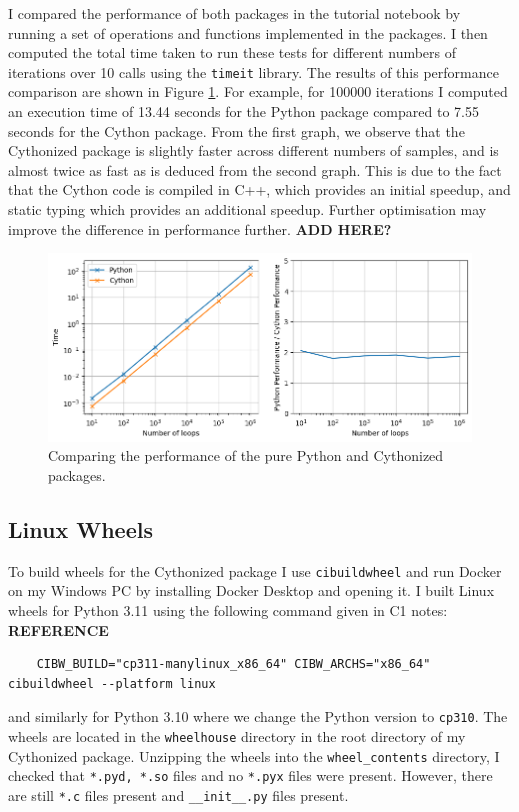 \documentclass{article}
\begin{document}
I compared the performance of both packages in the tutorial notebook by running a set of operations and functions implemented in the packages. I then computed the total time taken to run these tests for different numbers of iterations over 10 calls using the \texttt{timeit} library. The results of this performance comparison are shown in Figure \ref{fig:q9_timeit}. For example, for 100000 iterations I computed an execution time of 13.44 seconds for the Python package compared to 7.55 seconds for the Cython package. From the first graph, we observe that the Cythonized package is slightly faster across different numbers of samples, and is almost twice as fast as is deduced from the second graph. This is due to the fact that the Cython code is compiled in C++, which provides an initial speedup, and static typing which provides an additional speedup. Further optimisation may improve the difference in performance further. \textbf{ADD HERE?}

\begin{figure}
    \centering
    \includegraphics[width=1\linewidth]{q9_timeit.png}
    \caption{Comparing the performance of the pure Python and Cythonized packages.}
    \label{fig:q9_timeit}
\end{figure}

\subsection{Linux Wheels}
To build wheels for the Cythonized package I use \texttt{cibuildwheel} and run Docker on my Windows PC by installing Docker Desktop and opening it. I built Linux wheels for Python 3.11 using the following command given in C1 notes: \textbf{REFERENCE}
\begin{lstlisting}
    CIBW_BUILD="cp311-manylinux_x86_64" CIBW_ARCHS="x86_64" cibuildwheel --platform linux
\end{lstlisting}
 and similarly for Python 3.10 where we change the Python version to \texttt{cp310}. The wheels are located in the \texttt{wheelhouse} directory in the root directory of my Cythonized package. Unzipping the wheels into the \texttt{wheel\_contents} directory, I checked that \texttt{*.pyd, *.so} files and no \texttt{*.pyx} files were present. However, there are still \texttt{*.c} files present and \texttt{\_\_init\_\_.py} files present.
\end{document}
